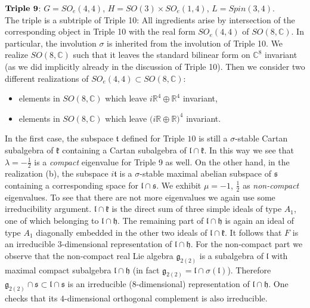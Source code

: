 \documentclass[10]{amsart}
\theoremstyle{remark}
\theoremstyle{definition}
\numberwithin{equation}{section}
\newcommand{\C}{\mathbb{C}}           %
\newcommand{\fg}{{\mathfrak g}}
\newcommand{\fh}{{\mathfrak h}}
\newcommand{\fk}{{\mathfrak k}}
\newcommand{\fl}{{\mathfrak l}}
\newcommand{\fs}{{\mathfrak s}}
\begin{document}
{\underline{$\text{\bf Triple 9}$}: $G=SO_{e}(4,4)$, $H=SO(3)\times SO_{e}(1,4)$, $L=Spin(3,4)$.\\
The triple is a subtriple of Triple 10: All ingredients arise by intersection of the corresponding object in Triple 10 with the real form $SO_e(4,4)$ of $SO(8,{\mathbb C})$.
In particular, the involution $\sigma$ is inherited from the involution of Triple 10.
We realize $SO(8,{\mathbb C})$ such that it leaves the standard bilinear form on $\C^8$ invariant (as we did implicitly already in the discussion of Triple 10). 
Then we consider two different realizations of  $SO_e(4,4)\subset SO(8,{\mathbb C})$:
%
\begin{itemize}
\item[(a)] elements in $SO(8,{\mathbb C})$ which leave $i{\mathbb R}^4\oplus{\mathbb R}^4$ invariant,
\item[(b)]  elements in $SO(8,{\mathbb C})$ which leave $\big({i\mathbb R}\oplus{\mathbb R}\big)^4$ invariant.
\end{itemize}
%
In the first case, the subspace ${\mathfrak t}$ defined for Triple $10$ is still a $\sigma$-stable Cartan subalgebra of ${\mathfrak k}$ containing a Cartan subalgebra of $\fl\cap \fk$. In this way we see that $\lambda=-\frac{1}{2}$ is a {\it compact} eigenvalue for Triple 9 as well. On the other hand, in the realization (b), the subspace $i{\mathfrak t}$ is a $\sigma$-stable maximal  abelian subspace of $\fs$ containing a corresponding space for ${\mathfrak l}\cap{\mathfrak s}$. We exhibit $\mu=-1$, $\frac{1}{2}$ as {\it non-compact} eigenvalues. 
To see that there are not more eigenvalues we again use some irreducibility argument. $\fl\cap\fk$ is the direct sum of three simple ideals of type $A_1$, one of which belonging to $\fl\cap\fh$. The remaining part of $\fl\cap\fh$ is again an ideal of type $A_1$ diagonally embedded in the other two ideals of $\fl\cap\fk$. It follows that $F$ is an irreducible $3$-dimensional representation of $\fl\cap\fh$.  For the non-compact part we observe that the non-compact real Lie algebra $\fg_{2(2)}$ is a subalgebra of $\fl$ with maximal compact subalgebra $\fl\cap\fh$
(in fact $\fg_{2(2)}=\fl\cap \sigma(\fl)$). Therefore $\fg_{2(2)}\cap \fs\subset \fl\cap\fs$ is an irreducible ($8$-dimensional) representation of $\fl\cap\fh$.
One checks that its $4$-dimensional orthogonal complement is also irreducible.
\vspace*{0.3cm}

}
\end{document}
